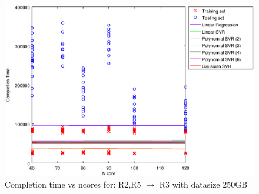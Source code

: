 
\begin {figure}[hbtp]
\centering
\includegraphics[width=\textwidth]{output/R2_R5_VS_R3_250_ALL_FEATURES/plot_R2_R5_VS_R3_250.eps}
\caption{Completion time vs ncores for: R2,R5 $\rightarrow$ R3 with datasize 250GB}
\label{fig:coreonly_linear_R2,R5_R3_250}
\end {figure}
